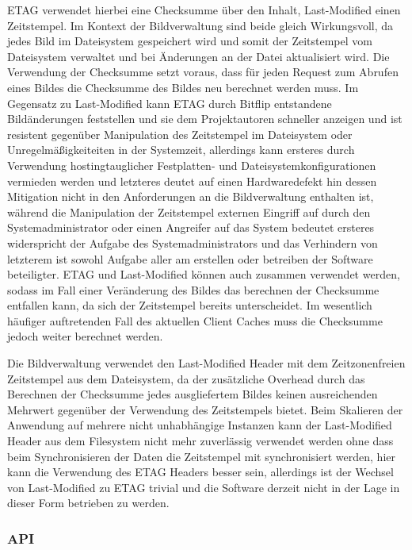 ETAG verwendet hierbei eine Checksumme über den Inhalt, Last-Modified einen
Zeitstempel. Im Kontext der Bildverwaltung sind beide gleich Wirkungsvoll, da
jedes Bild im Dateisystem gespeichert wird und somit der Zeitstempel vom
Dateisystem verwaltet und bei Änderungen an der Datei aktualisiert wird. Die
Verwendung der Checksumme setzt voraus, dass für jeden Request zum Abrufen eines
Bildes die Checksumme des Bildes neu berechnet werden muss. Im Gegensatz zu
Last-Modified kann ETAG durch Bitflip entstandene Bildänderungen feststellen und
sie dem Projektautoren schneller anzeigen und ist resistent gegenüber
Manipulation des Zeitstempel im Dateisystem oder Unregelmäßigkeiteiten in der
Systemzeit, allerdings kann ersteres durch Verwendung hostingtauglicher
Festplatten- und Dateisystemkonfigurationen vermieden werden und letzteres
deutet auf einen Hardwaredefekt hin dessen Mitigation nicht in den Anforderungen
an die Bildverwaltung enthalten ist, während die Manipulation der Zeitstempel
externen Eingriff auf durch den Systemadministrator oder einen Angreifer auf das
System bedeutet ersteres widerspricht der Aufgabe des Systemadministrators und
das Verhindern von letzterem ist sowohl Aufgabe aller am erstellen oder
betreiben der Software beteiligter. ETAG und Last-Modified können auch zusammen
verwendet werden, sodass im Fall einer Veränderung des Bildes das berechnen der
Checksumme entfallen kann, da sich der Zeitstempel bereits unterscheidet. Im
wesentlich häufiger auftretenden Fall des aktuellen Client Caches muss die
Checksumme jedoch weiter berechnet werden.

Die Bildverwaltung verwendet den Last-Modified Header mit dem Zeitzonenfreien
Zeitstempel aus dem Dateisystem, da der zusätzliche Overhead durch das Berechnen
der Checksumme jedes ausgliefertem Bildes keinen ausreichenden Mehrwert
gegenüber der Verwendung des Zeitstempels bietet. Beim Skalieren der Anwendung
auf mehrere nicht unhabhängige Instanzen kann der Last-Modified Header aus dem
Filesystem nicht mehr zuverlässig verwendet werden ohne dass beim
Synchronisieren der Daten die Zeitstempel mit synchronisiert werden, hier kann
die Verwendung des ETAG Headers besser sein, allerdings ist der Wechsel von
Last-Modified zu ETAG trivial und die Software derzeit nicht in der Lage in
dieser Form betrieben zu werden.

\subsubsection{API}

